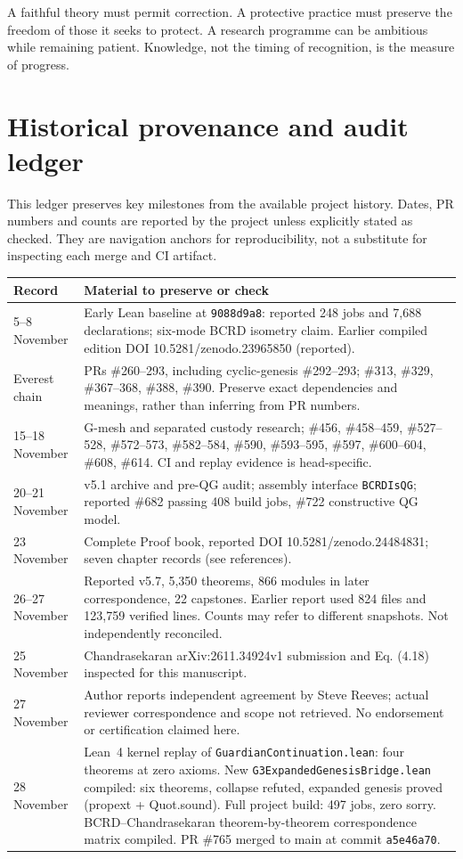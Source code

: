 \documentclass[11pt,a4paper]{article}
\begin{document}
A faithful theory must permit correction. A protective practice must preserve the freedom of those it seeks to protect. A research programme can be ambitious while remaining patient. Knowledge, not the timing of recognition, is the measure of progress.
\clearpage
\appendix
\section{Historical provenance and audit ledger}
This ledger preserves key milestones from the available project history. Dates, PR numbers and counts are reported by the project unless explicitly stated as checked. They are navigation anchors for reproducibility, not a substitute for inspecting each merge and CI artifact.

\noindent\begin{tabularx}{\linewidth}{@{}p{31mm}X@{}}\toprule
Record & Material to preserve or check\\\midrule
5--8 November & Early Lean baseline at \texttt{9088d9a8}: reported 248 jobs and 7,688 declarations; six-mode BCRD isometry claim. Earlier compiled edition DOI 10.5281/zenodo.23965850 (reported).\\
Everest chain & PRs \#260--293, including cyclic-genesis \#292--293; \#313, \#329, \#367--368, \#388, \#390. Preserve exact dependencies and meanings, rather than inferring from PR numbers.\\
15--18 November & G-mesh and separated custody research; \#456, \#458--459, \#527--528, \#572--573, \#582--584, \#590, \#593--595, \#597, \#600--604, \#608, \#614. CI and replay evidence is head-specific.\\
20--21 November & v5.1 archive and pre-QG audit; assembly interface \texttt{BCRDIsQG}; reported \#682 passing 408 build jobs, \#722 constructive QG model.\\
23 November & Complete Proof book, reported DOI 10.5281/zenodo.24484831; seven chapter records (see references).\\
26--27 November & Reported v5.7, 5,350 theorems, 866 modules in later correspondence, 22 capstones. Earlier report used 824 files and 123,759 verified lines. Counts may refer to different snapshots. Not independently reconciled.\\
25 November & Chandrasekaran arXiv:2611.34924v1 submission and Eq. (4.18) inspected for this manuscript.\\
27 November & Author reports independent agreement by Steve Reeves; actual reviewer correspondence and scope not retrieved. No endorsement or certification claimed here.\\
28 November & Lean~4 kernel replay of \texttt{GuardianContinuation.lean}: four theorems at zero axioms. New \texttt{G3ExpandedGenesisBridge.lean} compiled: six theorems, collapse refuted, expanded genesis proved (propext + Quot.sound). Full project build: 497 jobs, zero sorry. BCRD--Chandrasekaran theorem-by-theorem correspondence matrix compiled. PR \#765 merged to main at commit \texttt{a5e46a70}.\\\bottomrule
\end{tabularx}
\end{document}
